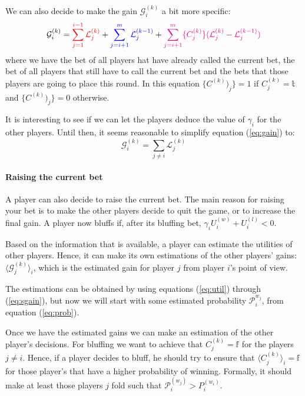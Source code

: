 \documentclass[a4paper,10pt]{article}
\begin{document}
We can also decide to make the gain $\mathcal G^{(k)}_i$ a bit more specific:
\begin{equation}
\mathcal G^{(k)}_i = {\color{red} \sum_{j=1}^{i-1} \mathcal L^{(k)}_j} + {\color{blue} \sum_{j=i+1}^m \mathcal L^{(k-1)}_j} + {\color{magenta} \sum_{j=i+1}^m \{ C^{(k)}_j\} (\mathcal L^{(k)}_j - \mathcal L^{(k-1)}_j)}
\label{eq:gain}
\end{equation}
where we have the {\color{red} bet of all players hat have already called the current bet}, the {\color{blue} bet of all players that still have to call the current bet} and {\color{magenta} the bets that those players are going to place this round}. In this equation $\{C^{(k)})_j\} = 1$ if $C^{(k)}_j=\mathbb{t}$ and $\{C^{(k)})_j\} = 0$ otherwise.

It is interesting to see if we can let the players deduce the value of $\gamma_i$ for the other players. Until then, it seems reasonable to simplify equation (\ref{eq:gain}) to:
\begin{equation}
\mathcal{G}^{(k)}_i = \sum_{j\neq i} \mathcal L^{(k)}_j
\label{eq:sgain}
\end{equation}


\paragraph{Raising the current bet}
A player can also decide to raise the current bet. The main reason for raising your bet is to make the other players decide to quit the game, or to increase the final gain. A player now bluffs if, after its bluffing bet, $\gamma_i U^{(w)}_i + U^{(l)}_i < 0$. 

Based on the information that is available, a player can estimate the utilities of other players. Hence, it can make its own estimations of the other players' gains: $\langle \mathcal G^{(k)}_j \rangle_i$, which is the estimated gain for player $j$ from player $i$'s point of view. 

The estimations can be obtained by using equations (\ref{eq:util}) through (\ref{eq:sgain}), but now we will start with some estimated probability $\mathcal P^{w_j}_i$, from equation (\ref{eq:prob}).

Once we have the estimated gains we can make an estimation of the other player's decisions. For bluffing we want to achieve that $C^{(k)}_j = \mathbb{f}$ for the players $j\neq i$. Hence, if a player decides to bluff, he should try to ensure that $\langle C^{(k)}_j \rangle_i = \mathbb{f}$ for those player's that have a higher probability of winning. Formally, it should make at least those players $j$ fold such that $\mathcal P^{(w_j)}_i > P^{(w_i)}_i$.
\end{document}
